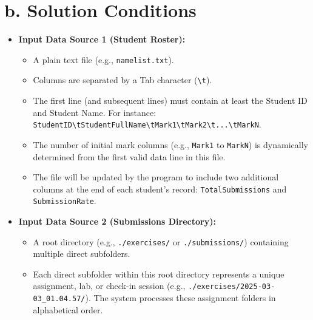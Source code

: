 \documentclass[11pt, a4paper]{article}
\begin{document}
\section*{b. Solution Conditions}
\begin{itemize}[leftmargin=*]
    \item \textbf{Input Data Source 1 (Student Roster):}
    \begin{itemize}
        \item A plain text file (e.g., \texttt{namelist.txt}).
        \item Columns are separated by a Tab character (\texttt{\textbackslash t}).
        \item The first line (and subsequent lines) must contain at least the Student ID and Student Name. For instance: \texttt{StudentID\textbackslash tStudentFullName\textbackslash tMark1\textbackslash tMark2\textbackslash t...\textbackslash tMarkN}.
        \item The number of initial mark columns (e.g., \texttt{Mark1} to \texttt{MarkN}) is dynamically determined from the first valid data line in this file.
        \item The file will be updated by the program to include two additional columns at the end of each student's record: \texttt{TotalSubmissions} and \texttt{SubmissionRate}.
    \end{itemize}

    \item \textbf{Input Data Source 2 (Submissions Directory):}
    \begin{itemize}
        \item A root directory (e.g., \texttt{./exercises/} or \texttt{./submissions/}) containing multiple direct subfolders.
        \item Each direct subfolder within this root directory represents a unique assignment, lab, or check-in session (e.g., \texttt{./exercises/2025-03-03\_01.04.57/}). The system processes these assignment folders in alphabetical order.
    \end{itemize}


\end{itemize}
\end{document}
